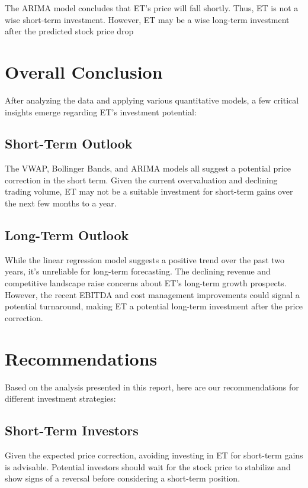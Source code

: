 \documentclass[9pt,a4paper,twoside]{tau}
\begin{document}
                The ARIMA model concludes that ET's price will fall shortly. Thus, ET is not a wise short-term investment. However, ET may be a wise long-term investment after the predicted stock price drop 

\section{Overall Conclusion}

    After analyzing the data and applying various quantitative models, a few critical insights emerge regarding ET's investment potential: 

    \subsection{Short-Term Outlook}

        The VWAP, Bollinger Bands, and ARIMA models all suggest a potential price correction in the short term. Given the current overvaluation and declining trading volume, ET may not be a suitable investment for short-term gains over the next few months to a year. 

    \subsection{Long-Term Outlook}

        While the linear regression model suggests a positive trend over the past two years, it's unreliable for long-term forecasting. The declining revenue and competitive landscape raise concerns about ET's long-term growth prospects. However, the recent EBITDA and cost management improvements could signal a potential turnaround, making ET a potential long-term investment after the price correction. 

\section{Recommendations}

    Based on the analysis presented in this report, here are our recommendations for different investment strategies:

    \subsection{Short-Term Investors}

        Given the expected price correction, avoiding investing in ET for short-term gains is advisable. Potential investors should wait for the stock price to stabilize and show signs of a reversal before considering a short-term position.
\end{document}
